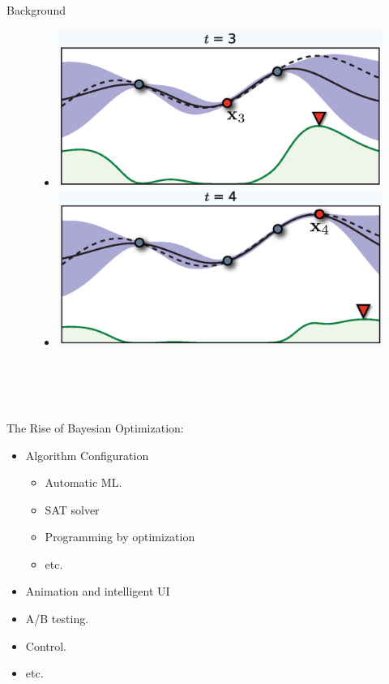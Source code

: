 \documentclass[final]{beamer}
\begin{document}
\begin{frame}[t]
\begin{columns}[T]
\begin{column}{.48\textwidth}
\begin{block}{Background}
\begin{minipage}[l]{0.45\columnwidth}
\begin{figure}
\begin{itemize}
    \item[] \includegraphics[width=0.75\columnwidth]{../Presentation/figs/bo2}
    \item[] \includegraphics[width=0.75\columnwidth]{../Presentation/figs/bo3}
   \end{itemize}
  \end{figure}
  \end{minipage}
  \\~\\~\\
  \begin{minipage}[l]{0.63\columnwidth}
  The Rise of Bayesian Optimization: 
     \begin{itemize}
   \item Algorithm Configuration
   \begin{itemize}
    \item Automatic ML.
    \item SAT solver
    \item Programming by optimization
    \item etc.
   \end{itemize}
   \item Animation and intelligent UI
   \item A/B testing.
   \item Control.
   \item etc.
   \end{itemize}
    \end{minipage}
  \begin{minipage}[r]{0.35\columnwidth}
     \begin{figure}[t]

\end{figure}
\end{minipage}
\end{block}
\end{column}
\end{columns}
\end{frame}
\end{document}
